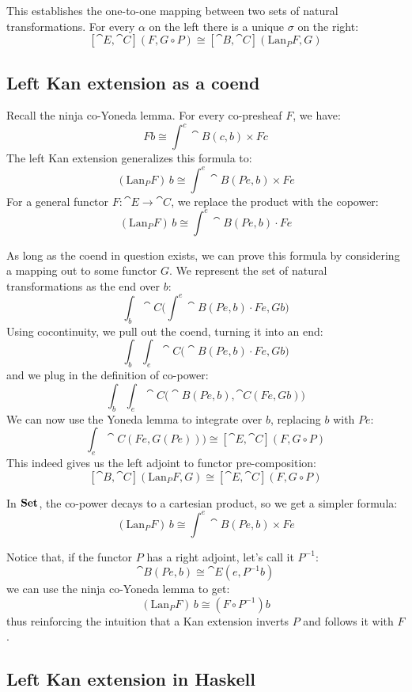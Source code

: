 \documentclass[DaoFP]{subfiles}
\begin{document}
This establishes the one-to-one mapping between two sets of natural transformations. For every $\alpha$ on the left there is a unique $\sigma$ on the right:
\[  [\cat E, \cat C] (F, G \circ P) \cong [\cat B, \cat C](\text{Lan}_P F , G)  \]


\subsection{Left Kan extension as a coend}

Recall the ninja co-Yoneda lemma. For every co-presheaf $F$, we have:
\[ F b \cong \int^{c} \cat B(c, b) \times F c \]
The left Kan extension generalizes this formula to:
\[ (\text{Lan}_P F)\, b \cong \int^{e} \cat B (P e, b) \times F e \]
For a general functor $F \colon \cat E \to \cat C$, we replace the product with the copower:
\[ (\text{Lan}_P F)\, b \cong \int^{e} \cat B(P e, b) \cdot F e \]

As long as the coend in question exists, we can prove this formula by considering a mapping out to some functor $G$. We represent the set of natural transformations as the end over $b$:
\[\int_b \cat C \big(\int^e \cat B(P e, b) \cdot F e, G b\big) \]
Using cocontinuity, we pull out the coend, turning it into an end:
\[\int_b \int_e \cat C \big(\cat B(P e, b) \cdot F e, G b\big) \]
and we plug in the definition of co-power:
\[\int_b \int_e \cat C \big(\cat B(P e, b), \cat C (F e, G b)\big) \]
We can now use the Yoneda lemma to integrate over $b$, replacing $b$ with $P e$:
\[\int_e \cat C (F e, G (P e))\big) \cong  [\cat E, \cat C] (F, G \circ P) \]
This indeed gives us the left adjoint to functor pre-composition:
\[ [\cat B, \cat C](\text{Lan}_P F , G) \cong  [\cat E, \cat C] (F, G \circ P) \]

In $\mathbf{Set}$, the co-power decays to a cartesian product, so we get a simpler formula:
\[ (\text{Lan}_P F)\, b \cong \int^{e} \cat B (P e, b) \times F e \]

 Notice that, if the functor $P$ has a right adjoint, let's call it $P^{-1}$:
 \[ \cat B(P e , b) \cong \cat E(e, P^{-1} b) \]
 we can use the ninja co-Yoneda lemma to get:
 \[  (\text{Lan}_P F)\, b \cong (F \circ P^{-1}) b \]
 thus reinforcing the intuition that a Kan extension inverts $P$ and follows it with $F$.
 
\subsection{Left Kan extension in Haskell}
\end{document}

